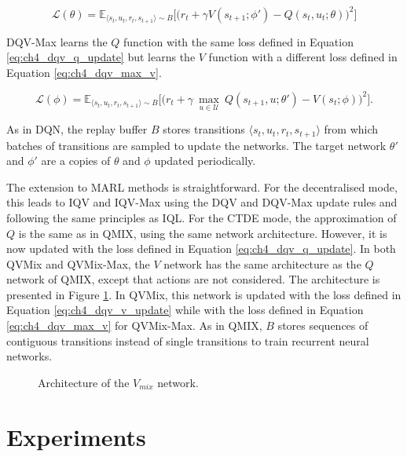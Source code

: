 \begin{equation}
    \mathcal{L}(\theta) = \mathbb{E}_{\langle s_{t}, u_{t},r_{t},s_{t+1}\rangle\sim B} \bigg[\big(r_{t} + \gamma V(s_{t+1}; \phi')  - Q(s_{t}, u_{t}; \theta)\big)^{2}\bigg]
\label{eq:ch4_dqv_q_update}
\end{equation}
    
DQV-Max learns the $Q$ function with the same loss defined in Equation \eqref{eq:ch4_dqv_q_update} but learns the $V$ function with a different loss defined in Equation \ref{eq:ch4_dqv_max_v}.
    
\begin{equation}
        \mathcal{L}(\phi) = \mathbb{E}_{\langle s_{t}, u_{t},r_{t},s_{t+1}\rangle\sim B} \bigg[\big(r_{t} + \gamma \: \underset{u\in \mathcal{U}}{\max}\: Q(s_{t+1}, u; \theta') - V(s_{t}; \phi)\big)^{2}\bigg].
        \label{eq:ch4_dqv_max_v}
\end{equation}

As in DQN, the replay buffer $B$ stores transitions $\langle s_{t},u_{t},r_{t},s_{t+1}\rangle$ from which batches of transitions are sampled to update the networks.
The target network $\theta'$ and $\phi'$ are a copies of $\theta$ and $\phi$ updated periodically.

The extension to MARL methods is straightforward.
For the decentralised mode, this leads to IQV and IQV-Max using the DQV and DQV-Max update rules and following the same principles as IQL.
For the CTDE mode, the approximation of $Q$ is the same as in QMIX, using the same network architecture.
However, it is now updated with the loss defined in Equation \ref{eq:ch4_dqv_q_update}.
In both QVMix and QVMix-Max, the $V$ network has the same architecture as the $Q$ network of QMIX, except that actions are not considered.
The architecture is presented in Figure \ref{fig:ch4_qvmix}.
In QVMix, this network is updated with the loss defined in Equation \ref{eq:ch4_dqv_v_update} while with the loss defined in Equation \ref{eq:ch4_dqv_max_v} for QVMix-Max. 
As in QMIX, $B$ stores sequences of contiguous transitions instead of single transitions to train recurrent neural networks.

\begin{figure}
\centering

\caption{Architecture of the $V_{mix}$ network.}
\label{fig:ch4_qvmix}
\end{figure}

\section{Experiments} \label{sec:ch4_experiments}

